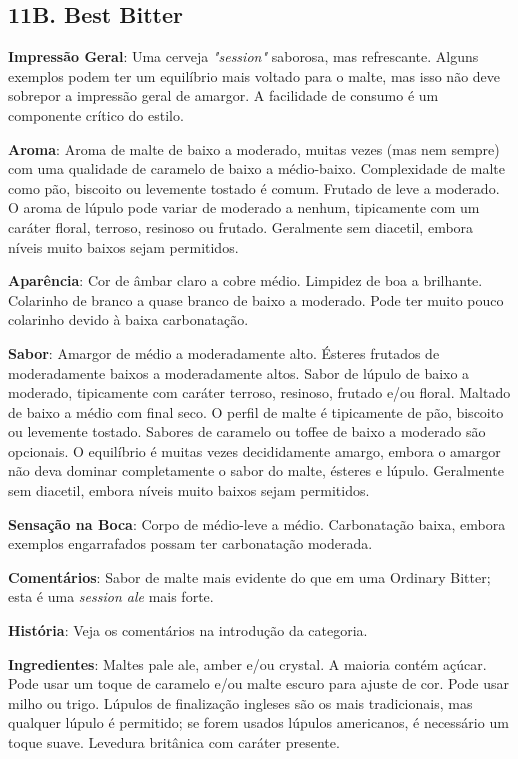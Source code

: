 \subsection*{11B. Best Bitter}
\textbf{Impressão Geral}: Uma cerveja \textit{"session"} saborosa, mas refrescante. Alguns exemplos podem ter um equilíbrio mais voltado para o malte, mas isso não deve sobrepor a impressão geral de amargor. A facilidade de consumo é um componente crítico do estilo.

\textbf{Aroma}: Aroma de malte de baixo a moderado, muitas vezes (mas nem sempre) com uma qualidade de caramelo de baixo a médio-baixo. Complexidade de malte como pão, biscoito ou levemente tostado é comum. Frutado de leve a moderado. O aroma de lúpulo pode variar de moderado a nenhum, tipicamente com um caráter floral, terroso, resinoso ou frutado. Geralmente sem diacetil, embora níveis muito baixos sejam permitidos.

\textbf{Aparência}: Cor de âmbar claro a cobre médio. Limpidez de boa a brilhante. Colarinho de branco a quase branco de baixo a moderado. Pode ter muito pouco colarinho devido à baixa carbonatação.

\textbf{Sabor}: Amargor de médio a moderadamente alto. Ésteres frutados de moderadamente baixos a moderadamente altos. Sabor de lúpulo de baixo a moderado, tipicamente com caráter terroso, resinoso, frutado e/ou floral. Maltado de baixo a médio com final seco. O perfil de malte é tipicamente de pão, biscoito ou levemente tostado. Sabores de caramelo ou toffee de baixo a moderado são opcionais. O equilíbrio é muitas vezes decididamente amargo, embora o amargor não deva dominar completamente o sabor do malte, ésteres e lúpulo. Geralmente sem diacetil, embora níveis muito baixos sejam permitidos.

\textbf{Sensação na Boca}: Corpo de médio-leve a médio. Carbonatação baixa, embora exemplos engarrafados possam ter carbonatação moderada.

\textbf{Comentários}: Sabor de malte mais evidente do que em uma Ordinary Bitter; esta é uma \textit{session ale} mais forte.

\textbf{História}: Veja os comentários na introdução da categoria.

\textbf{Ingredientes}: Maltes pale ale, amber e/ou crystal. A maioria contém açúcar. Pode usar um toque de caramelo e/ou malte escuro para ajuste de cor. Pode usar milho ou trigo. Lúpulos de finalização ingleses são os mais tradicionais, mas qualquer lúpulo é permitido; se forem usados lúpulos americanos, é necessário um toque suave. Levedura britânica com caráter presente.

